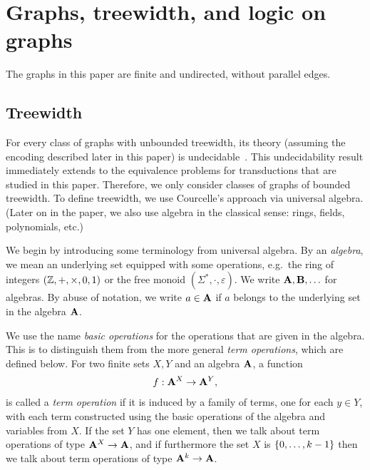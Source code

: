 \section{Graphs, treewidth, and logic on graphs}
The graphs in this paper are finite and undirected, without  parallel edges. 

\subsection{Treewidth} 
\label{sec:treewidth-definition}
For every class of graphs with unbounded treewidth, its \mso theory (assuming the \msotwo encoding described later in this paper) is undecidable~\cite[Theorem 8]{seese1991structure}. This undecidability result immediately extends to the equivalence problems for \mso transductions that are studied in this paper. Therefore, we  only consider classes of graphs of bounded treewidth.  To define treewidth, we use Courcelle's  approach via universal algebra. (Later on in the paper, we also use algebra in the classical sense: rings, fields, polynomials, etc.)


 We begin by introducing some terminology from universal algebra. By an \emph{algebra}, we mean an underlying set equipped with some  operations, e.g.~the ring of integers $(\mathbb Z, + , \times, 0, 1)$ or the free monoid $(\Sigma^*, \cdot, \varepsilon)$. We write $\mathbf{A}, \mathbf{B}, \ldots$ for algebras. By abuse of notation, we write $a \in \mathbf{A}$ if $a$ belongs to the underlying set in the algebra $\mathbf{A}$. 

We use the name \emph{basic operations} for the operations that are given in the algebra. This is to distinguish them from the more general \emph{term operations}, which are defined below.
        For two finite sets $X,Y$ and an algebra $\mathbf{A}$, a function
        \begin{align*}
            f : \mathbf{A}^X \to \mathbf{A}^Y,
            \end{align*}
            is called a \emph{term operation} if it is induced by a family of terms, one for each $y \in Y$, with each term  constructed using the basic operations of the algebra and variables from $X$.  If the set $Y$ has one element, then we talk about term operations of type $\mathbf{A}^X \to 
        \mathbf{A}$, and if furthermore the set $X$ is $\{0,\ldots,k-1\}$ then we talk about term operations of type $\mathbf{A}^k \to \mathbf{A}$. 

